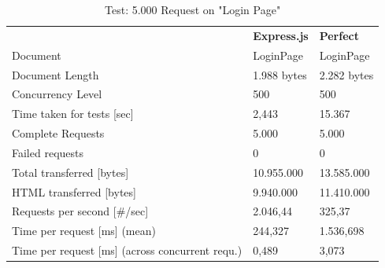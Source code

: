 \begin{table}[h]
\begin{center}
\begin{tabular}{p{5cm}p{3.5cm}p{4.5cm}}
\rowcolor{gray20}														& \textbf{Express.js}	  		& \textbf{Perfect}		\\ 
\rowcolor{gray5}		Document 											& LoginPage					& LoginPage			\\ 
\rowcolor{gray20}	Document Length										& 1.988 bytes				& 2.282 bytes		\\ 
\rowcolor{gray5}		Concurrency Level									& 500						& 500				\\ 
\rowcolor{gray20}	Time taken for tests [sec]								& 2,443						& 15.367			\\ 
\rowcolor{gray5}		Complete Requests									& 5.000						& 5.000				\\
\rowcolor{gray20}	Failed requests										& 0							& 0					\\ 
\rowcolor{gray5}		Total transferred [bytes]								& 10.955.000				& 13.585.000 		\\ 
\rowcolor{gray20}	HTML transferred	[bytes]								& 9.940.000					& 11.410.000		\\ 
\rowcolor{gray5}		Requests per second [\#/sec]							& 2.046,44					& 325,37			\\ 
\rowcolor{gray20}	Time per request [ms]	 (mean)							& 244,327					& 1.536,698			\\
\rowcolor{gray5}		Time per request [ms]	 (across concurrent requ.)			& 0,489						& 3,073				\\ 
\end{tabular}
\caption{Test: 5.000 Request on "Login Page"} \label{tab:fivethousandrequests}
\end{center}
\end{table}

